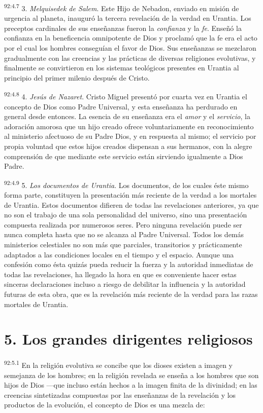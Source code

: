 \documentclass[twoside, 11pt]{book}
\begin{document}
\par
\textsuperscript{92:4.7} 3. \textit{Melquisedek de Salem}. Este Hijo de Nebadon, enviado en misión de urgencia al planeta, inauguró la tercera revelación de la verdad en Urantia. Los preceptos cardinales de sus enseñanzas fueron la \textit{confianza} y la \textit{fe}. Enseñó la confianza en la beneficencia omnipotente de Dios y proclamó que la fe era el acto por el cual los hombres conseguían el favor de Dios. Sus enseñanzas se mezclaron gradualmente con las creencias y las prácticas de diversas religiones evolutivas, y finalmente se convirtieron en los sistemas teológicos presentes en Urantia al principio del primer milenio después de Cristo.

\par
\textsuperscript{92:4.8} 4. \textit{Jesús de Nazaret}. Cristo Miguel presentó por cuarta vez en Urantia el concepto de Dios como Padre Universal, y esta enseñanza ha perdurado en general desde entonces. La esencia de su enseñanza era el \textit{amor} y el \textit{servicio}, la adoración amorosa que un hijo creado ofrece voluntariamente en reconocimiento al ministerio afectuoso de su Padre Dios, y en respuesta al mismo; el servicio por propia voluntad que estos hijos creados dispensan a sus hermanos, con la alegre comprensión de que mediante este servicio están sirviendo igualmente a Dios Padre.

\par
\textsuperscript{92:4.9} 5. \textit{Los documentos de Urantia}. Los documentos, de los cuales éste mismo forma parte, constituyen la presentación más reciente de la verdad a los mortales de Urantia. Estos documentos difieren de todas las revelaciones anteriores, ya que no son el trabajo de una sola personalidad del universo, sino una presentación compuesta realizada por numerosos seres. Pero ninguna revelación puede ser nunca completa hasta que no se alcanza al Padre Universal. Todos los demás ministerios celestiales no son más que parciales, transitorios y prácticamente adaptados a las condiciones locales en el tiempo y el espacio. Aunque una confesión como ésta quizás pueda reducir la fuerza y la autoridad inmediatas de todas las revelaciones, ha llegado la hora en que es conveniente hacer estas sinceras declaraciones incluso a riesgo de debilitar la influencia y la autoridad futuras de esta obra, que es la revelación más reciente de la verdad para las razas mortales de Urantia.

\section*{5. Los grandes dirigentes religiosos}
\par
\textsuperscript{92:5.1} En la religión evolutiva se concibe que los dioses existen a imagen y semejanza de los hombres; en la religión revelada se enseña a los hombres que son hijos de Dios ---que incluso están hechos a la imagen finita de la divinidad; en las creencias sintetizadas compuestas por las enseñanzas de la revelación y los productos de la evolución, el concepto de Dios es una mezcla de:
\end{document}
